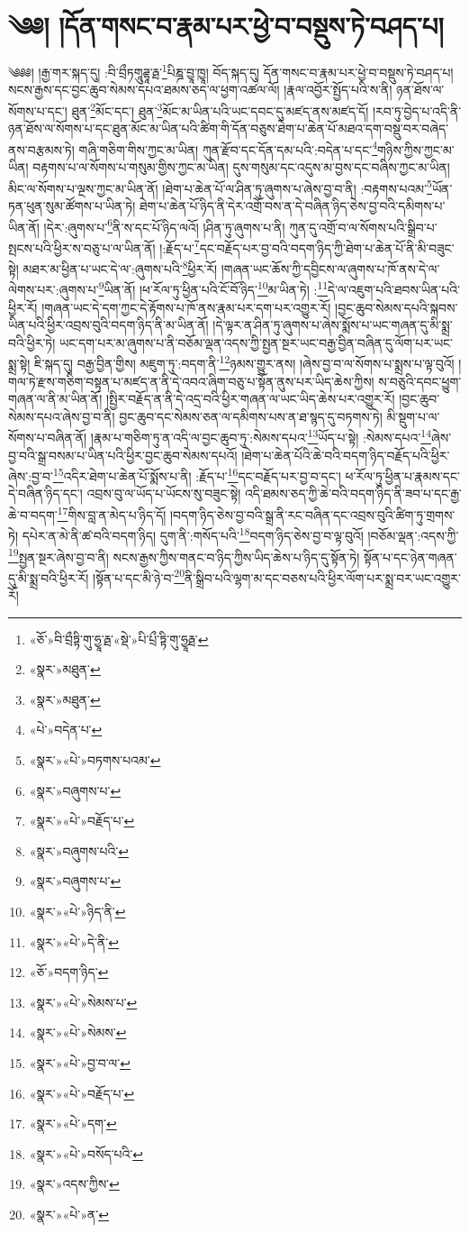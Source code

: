 \chapter{༄༅། །དོན་གསང་བ་རྣམ་པར་ཕྱེ་བ་བསྡུས་ཏེ་བཤད་པ།}༄༅༅། །རྒྱ་གར་སྐད་དུ། :བི་བྲྀཏགཱུཌྷཱ་རྠ་\footnote{«ཅོ་»བི་བྲྀཏྟི་གུ་ཧྱཱ་རྠ་«སྡེ་»པི་པྲྀ་ཏྟི་གུ་ཧྱཱརྠ་}པིཎྜ་བྱཱ་ཁྱཱ། བོད་སྐད་དུ། དོན་གསང་བ་རྣམ་པར་ཕྱེ་བ་བསྡུས་ཏེ་བཤད་པ། སངས་རྒྱས་དང་བྱང་ཆུབ་སེམས་དཔའ་ཐམས་ཅད་ལ་ཕྱག་འཚལ་ལོ། །རྣལ་འབྱོར་སྤྱོད་པའི་ས་ནི། ཉན་ཐོས་ལ་སོགས་པ་དང་། ཐུན་\footnote{«སྣར་»མཐུན་}མོང་དང་། ཐུན་\footnote{«སྣར་»མཐུན་}མོང་མ་ཡིན་པའི་ཡང་དབང་དུ་མཛད་ནས་མཛད་དོ། །རབ་ཏུ་བྱེད་པ་འདི་ནི་ཉན་ཐོས་ལ་སོགས་པ་དང་ཐུན་མོང་མ་ཡིན་པའི་ཚིག་གི་དོན་བཅུས་ཐེག་པ་ཆེན་པོ་མཐའ་དག་བསྡུ་བར་བཞེད་ནས་བརྩམས་ཏེ། གཞི་གཅིག་གིས་ཀྱང་མ་ཡིན། ཀུན་རྫོབ་དང་དོན་དམ་པའི་:བདེན་པ་དང་\footnote{«པེ་»བདེན་པ་}གཉིས་ཀྱིས་ཀྱང་མ་ཡིན། བརྟགས་པ་ལ་སོགས་པ་གསུམ་གྱིས་ཀྱང་མ་ཡིན། དུས་གསུམ་དང་འདུས་མ་བྱས་དང་བཞིས་ཀྱང་མ་ཡིན། མིང་ལ་སོགས་པ་ལྔས་ཀྱང་མ་ཡིན་ནོ། །ཐེག་པ་ཆེན་པོ་ལ་ཤིན་ཏུ་ཞུགས་པ་ཞེས་བྱ་བ་ནི། :བརྟགས་པའམ་\footnote{«སྣར་»«པེ་»བཏགས་པའམ་}ཡོན་ཏན་ཕུན་སུམ་ཚོགས་པ་ཡིན་ཏེ། ཐེག་པ་ཆེན་པོ་ཉིད་ནི་དེར་འགྲོ་བས་ན་དེ་བཞིན་ཉིད་ཅེས་བྱ་བའི་དམིགས་པ་ཡིན་ནོ། །དེར་:ཞུགས་པ་\footnote{«སྣར་»བཞུགས་པ་}ནི་ས་དང་པོ་ཉིད་ལའོ། །ཤིན་ཏུ་ཞུགས་པ་ནི། ཀུན་དུ་འགྲོ་བ་ལ་སོགས་པའི་སྒྲིབ་པ་སྤངས་པའི་ཕྱིར་ས་བཅུ་པ་ལ་ཡིན་ནོ། །:རྗོད་པ་\footnote{«སྣར་»«པེ་»བརྗོད་པ་}དང་བརྗོད་པར་བྱ་བའི་བདག་ཉིད་ཀྱི་ཐེག་པ་ཆེན་པོ་ནི་མི་བཟུང་སྟེ། མཐར་མ་ཕྱིན་པ་ཡང་དེ་ལ་:ཞུགས་པའི་\footnote{«སྣར་»བཞུགས་པའི་}ཕྱིར་རོ། །གཞན་ཡང་ཆོས་ཀྱི་དབྱིངས་ལ་ཞུགས་པ་ཁོ་ནས་དེ་ལ་ལེགས་པར་:ཞུགས་པ་\footnote{«སྣར་»བཞུགས་པ་}ཡིན་ནོ། །ཕ་རོལ་ཏུ་ཕྱིན་པའི་ངོ་བོ་ཉིད་\footnote{«སྣར་»«པེ་»ཉིད་ནི་}མ་ཡིན་ཏེ། :\footnote{«སྣར་»«པེ་»དེ་ནི་}དེ་ལ་འཇུག་པའི་ཐབས་ཡིན་པའི་ཕྱིར་རོ། །གཞན་ཡང་དེ་དག་ཀྱང་དེ་རྟོགས་པ་ཁོ་ནས་རྣམ་པར་དག་པར་འགྱུར་རོ། །བྱང་ཆུབ་སེམས་དཔའི་སྐབས་ཡིན་པའི་ཕྱིར་འབྲས་བུའི་བདག་ཉིད་ནི་མ་ཡིན་ནོ། །དེ་ལྟར་ན་ཤིན་ཏུ་ཞུགས་པ་ཞེས་སྨོས་པ་ཡང་གཞན་དུ་མི་སྨྲ་བའི་ཕྱིར་ཏེ། ཡང་དག་པར་མ་ཞུགས་པ་ནི་བཅོམ་ལྡན་འདས་ཀྱི་སྤྱན་སྔར་ཡང་བརྒྱ་བྱིན་བཞིན་དུ་ལོག་པར་ཡང་སྨྲ་སྟེ། ཇི་སྐད་དུ། བརྒྱ་བྱིན་གྱིས། མཇུག་ཏུ་:བདག་ནི་\footnote{«ཅོ་»བདག་ཉིད་}ཉམས་གྱུར་ནས། །ཞེས་བྱ་བ་ལ་སོགས་པ་སྨྲས་པ་ལྟ་བུའོ། །གལ་ཏེ་རྫས་གཅིག་བསྟན་པ་མཛད་ན་ནི་དེ་འབའ་ཞིག་བཅུ་པ་སྟོན་ནུས་པར་ཡིད་ཆེས་ཀྱིས། ས་བཅུའི་དབང་ཕྱུག་གཞན་ལ་ནི་མ་ཡིན་ནོ། །སྤྱིར་བརྗོད་ན་ནི་དེ་འདྲ་བའི་ཕྱིར་གཞན་ལ་ཡང་ཡིད་ཆེས་པར་འགྱུར་རོ། །བྱང་ཆུབ་སེམས་དཔའ་ཞེས་བྱ་བ་ནི། བྱང་ཆུབ་དང་སེམས་ཅན་ལ་དམིགས་པས་ན་ཐ་སྙད་དུ་བཏགས་ཏེ། མི་སྡུག་པ་ལ་སོགས་པ་བཞིན་ནོ། །རྣམ་པ་གཅིག་ཏུ་ན་འདི་ལ་བྱང་ཆུབ་ཏུ་:སེམས་དཔའ་\footnote{«སྣར་»«པེ་»སེམས་པ་}ཡོད་པ་སྟེ། :སེམས་དཔའ་\footnote{«སྣར་»«པེ་»སེམས་}ཞེས་བྱ་བའི་སྒྲ་བསམ་པ་ཡིན་པའི་ཕྱིར་བྱང་ཆུབ་སེམས་དཔའོ། །ཐེག་པ་ཆེན་པོའི་ཆེ་བའི་བདག་ཉིད་བརྗོད་པའི་ཕྱིར་ཞེས་:བྱ་བ་\footnote{«སྣར་»«པེ་»བྱ་བ་ལ་}འདིར་ཐེག་པ་ཆེན་པོ་སྨོས་པ་ནི། :རྗོད་པ་\footnote{«སྣར་»«པེ་»བརྗོད་པ་}དང་བརྗོད་པར་བྱ་བ་དང་། ཕ་རོལ་ཏུ་ཕྱིན་པ་རྣམས་དང་དེ་བཞིན་ཉིད་དང་། འབྲས་བུ་ལ་ཡོད་པ་ཡོངས་སུ་བཟུང་སྟེ། འདི་ཐམས་ཅད་ཀྱི་ཆེ་བའི་བདག་ཉིད་ནི་ཟབ་པ་དང་རྒྱ་ཆེ་བ་བདག་\footnote{«སྣར་»«པེ་»དག་}གིས་བླ་ན་མེད་པ་ཉིད་དོ། །བདག་ཉིད་ཅེས་བྱ་བའི་སྒྲ་ནི་རང་བཞིན་དང་འབྲས་བུའི་ཚིག་ཏུ་གྲགས་ཏེ། དཔེར་ན་མེ་ནི་ཚ་བའི་བདག་ཉིད། དུག་ནི་:གསོད་པའི་\footnote{«སྣར་»«པེ་»བསོད་པའི་}བདག་ཉིད་ཅེས་བྱ་བ་ལྟ་བུའོ། །བཅོམ་ལྡན་:འདས་ཀྱི་\footnote{«སྣར་»འདས་ཀྱིས་}སྤྱན་སྔར་ཞེས་བྱ་བ་ནི། སངས་རྒྱས་ཀྱིས་གནང་བ་ཉིད་ཀྱིས་ཡིད་ཆེས་པ་ཉིད་དུ་སྟོན་ཏེ། སྟོན་པ་དང་ཉེན་གཞན་དུ་མི་སྨྲ་བའི་ཕྱིར་རོ། །སྟོན་པ་དང་མི་ཉེ་བ་\footnote{«སྣར་»«པེ་»ན་}ནི་སྒྲིབ་པའི་ལྷག་མ་དང་བཅས་པའི་ཕྱིར་ལོག་པར་སྨྲ་བར་ཡང་འགྱུར་རོ། 
